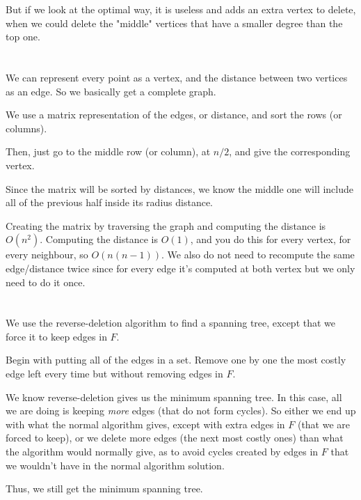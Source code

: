 \documentclass[11pt,letterpaper]{article}
\begin{document}
		But if we look at the optimal way, it is useless and adds an extra vertex to delete, when we could delete the "middle" vertices that have a smaller degree than the top one.
		
	\section{}
		We can represent every point as a vertex, and the distance between two vertices as an edge. So we basically get a complete graph.
		
		We use a matrix representation of the edges, or distance, and sort the rows (or columns).
		
		Then, just go to the middle row (or column), at $n/2$, and give the corresponding vertex.
		
		Since the matrix will be sorted by distances, we know the middle one will include all of the previous half inside its radius distance.
		
		Creating the matrix by traversing the graph and computing the distance is $O(n^2)$.
		Computing the distance is $O(1)$, and you do this for every vertex, for every neighbour, so $O(n(n-1))$. We also do not need to recompute the same edge/distance twice since for every edge it's computed at both vertex but we only need to do it once.
		
	\section{}
		We use the reverse-deletion algorithm to find a spanning tree, except that we force it to keep edges in $F$.
		
		Begin with putting all of the edges in a set.
		Remove one by one the most costly edge left every time but without removing edges in $F$.
		
		We know reverse-deletion gives us the minimum spanning tree.
		In this case, all we are doing is keeping \textit{more} edges (that do not form cycles).
		So either we end up with what the normal algorithm gives, except with extra edges in $F$ (that we are forced to keep), or we delete more edges (the next most costly ones) than what the algorithm would normally give, as to avoid cycles created by edges in $F$ that we wouldn't have in the normal algorithm solution.
		
		Thus, we still get the minimum spanning tree.
	
\end{document}
